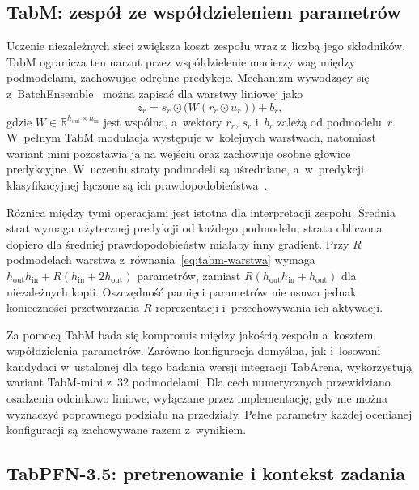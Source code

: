 \subsection{TabM: zespół ze współdzieleniem parametrów}
\label{sec:tabm-zespoly}

Uczenie niezależnych sieci zwiększa koszt zespołu wraz z~liczbą jego składników. TabM ogranicza ten narzut przez współdzielenie macierzy wag między podmodelami, zachowując odrębne predykcje. Mechanizm wywodzący się z~BatchEnsemble~\cite{wen2020batchensemble} można zapisać dla warstwy liniowej jako
\begin{equation}
z_r=s_r\odot\bigl(W(r_r\odot u_r)\bigr)+b_r,
\label{eq:tabm-warstwa}
\end{equation}
gdzie $W\in\mathbb{R}^{h_{\mathrm{out}}\times h_{\mathrm{in}}}$ jest wspólna, a~wektory $r_r$, $s_r$ i~$b_r$ zależą od podmodelu~$r$. W~pełnym TabM modulacja występuje w~kolejnych warstwach, natomiast wariant mini pozostawia ją na wejściu oraz zachowuje osobne głowice predykcyjne. W~uczeniu straty podmodeli są uśredniane, a~w~predykcji klasyfikacyjnej łączone są ich prawdopodobieństwa~\cite{gorishniy2025tabm}.

Różnica między tymi operacjami jest istotna dla interpretacji zespołu. Średnia strat wymaga użytecznej predykcji od każdego podmodelu; strata obliczona dopiero dla średniej prawdopodobieństw miałaby inny gradient. Przy $R$ podmodelach warstwa z~równania~\ref{eq:tabm-warstwa} wymaga $h_{\mathrm{out}}h_{\mathrm{in}}+R(h_{\mathrm{in}}+2h_{\mathrm{out}})$ parametrów, zamiast $R(h_{\mathrm{out}}h_{\mathrm{in}}+h_{\mathrm{out}})$ dla niezależnych kopii. Oszczędność pamięci parametrów nie usuwa jednak konieczności przetwarzania $R$ reprezentacji i~przechowywania ich aktywacji.

Za pomocą TabM bada się kompromis między jakością zespołu a~kosztem współdzielenia parametrów. Zarówno konfiguracja domyślna, jak i~losowani kandydaci w~ustalonej dla tego badania wersji integracji TabArena, wykorzystują wariant TabM-mini z~32 podmodelami. Dla cech numerycznych przewidziano osadzenia odcinkowo liniowe, wyłączane przez implementację, gdy nie można wyznaczyć poprawnego podziału na przedziały. Pełne parametry każdej ocenianej konfiguracji są zachowywane razem z~wynikiem.

\subsection{TabPFN-3.5: pretrenowanie i kontekst zadania}
\label{sec:tabpfn}

